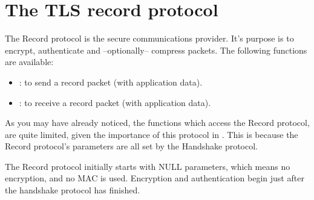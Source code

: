 \section{The TLS record protocol}

The Record protocol is the secure communications provider. It's purpose
is to encrypt, authenticate and --optionally-- compress packets.
The following functions are available:
\par
\begin{itemize}
\item {}:
to send a record packet (with application data).
\item {}:
to receive a record packet (with application data).
\end{itemize}

As you may have already noticed, the functions which access the Record protocol,
are quite limited, given the importance of this protocol in \tls{}.
This is because the Record protocol's parameters are all set by
the Handshake protocol.
\par
The Record protocol initially starts with NULL parameters, which means
no encryption, and no MAC is used. Encryption and authentication begin
just after the handshake protocol has finished.







